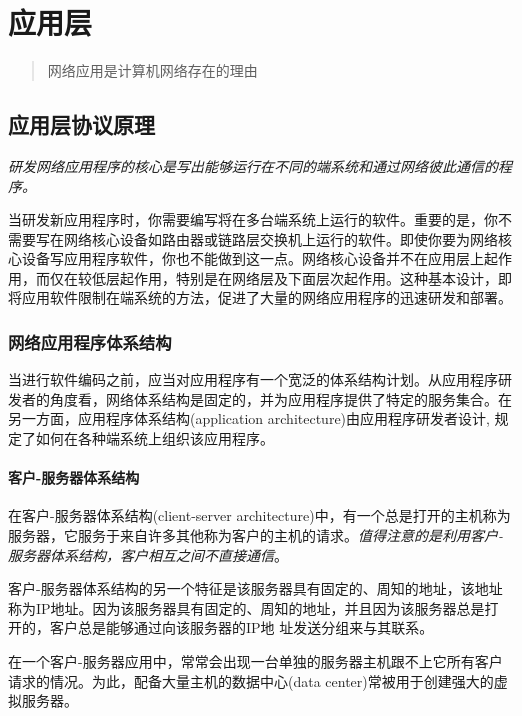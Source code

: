 \chapter{应用层}

\begin{quote}
    \centering
    网络应用是计算机网络存在的理由
\end{quote}

\section{应用层协议原理}

    \emph{研发网络应用程序的核心是写出能够运行在不同的端系统和通过网络彼此通信的程序。}

    当研发新应用程序时，你需要编写将在多台端系统上运行的软件。重要的是，你不需要写在网络核心设备如路由器或链路层交换机上运行的软件。即使你要为网络核心设备写应用程序软件，你也不能做到这一点。网络核心设备并不在应用层上起作用，而仅在较低层起作用，特别是在网络层及下面层次起作用。这种基本设计，即将应用软件限制在端系统的方法，促进了大量的网络应用程序的迅速研发和部署。

\subsection{网络应用程序体系结构}

    当进行软件编码之前，应当对应用程序有一个宽泛的体系结构计划。从应用程序研发者的角度看，网络体系结构是固定的，并为应用程序提供了特定的服务集合。在另一方面，应用程序体系结构(application architecture)由应用程序研发者设计, 规定了如何在各种端系统上组织该应用程序。

\subsubsection{客户-服务器体系结构}

    在客户-服务器体系结构(client-server architecture)中，有一个总是打开的主机称为服务器，它服务于来自许多其他称为客户的主机的请求。\emph{值得注意的是利用客户-服务器体系结构，客户相互之间不直接通信}。

    客户-服务器体系结构的另一个特征是该服务器具有固定的、周知的地址，该地址称为IP地址。因为该服务器具有固定的、周知的地址，并且因为该服务器总是打开的，客户总是能够通过向该服务器的IP地 址发送分组来与其联系。

    在一个客户-服务器应用中，常常会出现一台单独的服务器主机跟不上它所有客户请求的情况。为此，配备大量主机的数据中心(data center)常被用于创建强大的虚拟服务器。

